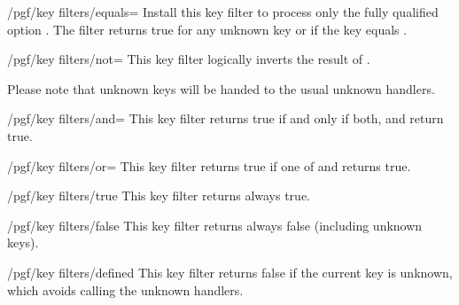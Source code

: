 \begin{key}{/pgf/key filters/equals=}
	Install this key filter to process only the fully qualified option . The filter returns true for any unknown key or if the key equals .
\begin{codeexample}[]
\end{codeexample}
\end{key}

\begin{key}{/pgf/key filters/not=}
	This key filter logically inverts the result of .
\begin{codeexample}[]
\end{codeexample}
	Please note that unknown keys will be handed to the usual unknown handlers.
\end{key}

\begin{key}{/pgf/key filters/and=}
	This key filter returns true if and only if both,  and  return true.

\end{key}

\begin{key}{/pgf/key filters/or=}
	This key filter returns true if one of  and  returns true.

\end{key}

\begin{key}{/pgf/key filters/true}
	This key filter returns always true.
\end{key}

\begin{key}{/pgf/key filters/false}
	This key filter returns always false (including unknown keys).
\end{key}

\begin{key}{/pgf/key filters/defined}
	This key filter returns false if the current key is unknown, which avoids calling the unknown handlers.
\end{key}

